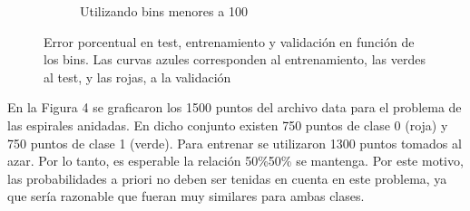 \documentclass[12pt, a4paper]{article}
\begin{document}
\begin{figure}
\begin{subfigure}[b]{0.45\textwidth}
        \caption{Utilizando bins menores a 100}
    \end{subfigure}
    \caption{Error porcentual en test, entrenamiento y validación en función de los bins. Las curvas azules corresponden al entrenamiento, las verdes al test, y las rojas, a la validación}
\end{figure}

\bigskip

En la Figura 4 se graficaron los 1500 puntos del archivo data para el problema de las espirales anidadas. En dicho conjunto existen 750 puntos de clase 0 (roja) y 750 puntos de clase 1 (verde). Para entrenar se utilizaron 1300 puntos tomados al azar. Por lo tanto, es esperable la relación 50\%50\% se mantenga. Por este motivo, las probabilidades a priori no deben ser tenidas en cuenta en este problema, ya que sería razonable que fueran muy similares para ambas clases.

\bigskip
\end{document}
